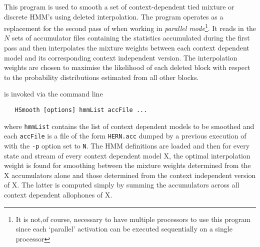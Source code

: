 %
%


\newpage
{}


This program is used to smooth a set of context-dependent tied mixture
or discrete HMM's using deleted interpolation.  
The program operates as a replacement for the second pass of 
when working in {\it parallel mode}\footnote{It is not,of course,
necessary to have multiple processors to use this program since each 
`parallel' activation can be executed sequentially on a single
processor}.  It reads in the $N$ sets of accumulator files containing the
statistics accumulated during the first pass and then interpolates the
mixture weights between each context dependent model and its corresponding 
context independent version.  The interpolation weights are chosen to 
maximise the likelihood of each deleted block with respect to the 
probability distributions estimated from all other blocks.


 is invoked via the command line
\begin{verbatim}
   HSmooth [options] hmmList accFile ...
\end{verbatim}
where {\tt hmmList} contains the list of context dependent models
to be smoothed and each {\tt accFile} is a file of the form
{\tt HERN.acc} dumped by a previous execution of  with the {\tt -p}
option set to {\tt N}.  The HMM definitions are loaded and then for
every state and stream of every context dependent model X, the optimal
interpolation weight is found for smoothing between the mixture
weights determined from the X accumulators alone and those determined
from the context independent version of X.  The latter is computed simply
by summing the accumulators across all context dependent allophones of X.

